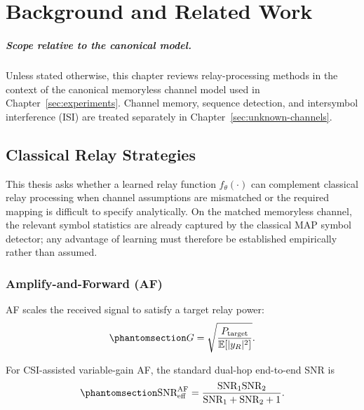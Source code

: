 \chapter{Background and Related Work}\label{sec:literature-review}

\paragraph{Scope relative to the canonical model.}
Unless stated otherwise, this chapter reviews relay-processing methods in the context of the canonical memoryless channel model used in Chapter~\ref{sec:experiments}. Channel memory, sequence detection, and intersymbol interference (ISI) are treated separately in Chapter~\ref{sec:unknown-channels}.

\section{Classical Relay Strategies}\label{sec:classical-relay-strategies}

This thesis asks whether a learned relay function \(f_\theta(\cdot)\) can complement classical relay processing when channel assumptions are mismatched or the required mapping is difficult to specify analytically. On the matched memoryless channel, the relevant symbol statistics are already captured by the classical MAP symbol detector; any advantage of learning must therefore be established empirically rather than assumed.

\subsection{Amplify-and-Forward (AF)}\label{sec:classical-relay-strategies-af}

AF scales the received signal to satisfy a target relay power:
\begin{equation}\protect\phantomsection\label{eq:af-gain}
G = \sqrt{\frac{P_{\text{target}}}{\mathbb{E}[|y_R|^2]}} .
\end{equation}

For CSI-assisted variable-gain AF, the standard dual-hop end-to-end SNR is \cite{Laneman2004CooperativeDiversity,TseViswanath2005Fundamentals}
\begin{equation}\protect\phantomsection\label{eq:af-snr}
\text{SNR}_{\text{eff}}^{\text{AF}}
=
\frac{\text{SNR}_1\text{SNR}_2}
{\text{SNR}_1+\text{SNR}_2+1}.
\end{equation}

